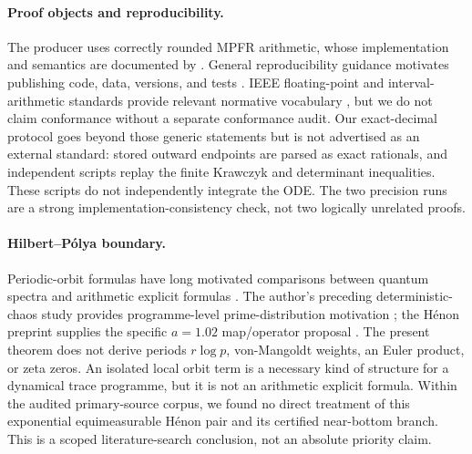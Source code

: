 \paragraph{Proof objects and reproducibility.}
The producer uses correctly rounded MPFR arithmetic, whose implementation
and semantics are documented by \citet{FousseEtAl2007}.  General
reproducibility guidance motivates publishing code, data, versions, and
tests \citep{StoddenEtAl2016}.  IEEE floating-point and interval-arithmetic
standards provide relevant normative vocabulary
\citep{IEEE7542019,IEEE1788_2015}, but we do not claim conformance without a
separate conformance audit.  Our exact-decimal protocol goes beyond those
generic statements but is not advertised as an external standard: stored
outward endpoints are parsed as exact rationals, and independent scripts
replay the finite Krawczyk and determinant inequalities.  These scripts do
not independently integrate the ODE.  The two precision runs are a strong
implementation-consistency check, not two logically unrelated proofs.

\paragraph{Hilbert--P\'olya boundary.}
Periodic-orbit formulas have long motivated comparisons between quantum
spectra and arithmetic explicit formulas \citep{Gutzwiller1971}.  The
author's preceding deterministic-chaos study provides programme-level
prime-distribution motivation \citep{Wang2026PrimeChaos}; the H\'enon
preprint supplies the specific \(a=1.02\) map/operator proposal
\citep{Wang2026HenonPreprint}.  The present theorem does
not derive periods \(r\log p\), von-Mangoldt weights, an Euler product, or
zeta zeros.  An isolated local orbit term is a necessary kind of structure
for a dynamical trace programme, but it is not an arithmetic explicit
formula.  Within the audited primary-source corpus, we found no direct
treatment of this exponential equimeasurable H\'enon pair and its certified
near-bottom branch.  This is a scoped literature-search conclusion, not an
absolute priority claim.

